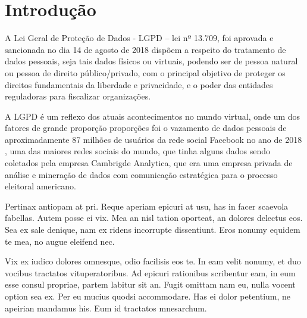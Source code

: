 \documentclass[
	12pt,				%
	openright,			%
	oneside,			%
	a4paper,			%
	english,			%
	french,				%
	spanish,			%
	brazil,				%
	]{abntex2}
\begin{document}

\tableofcontents*



\textual
\setcounter{page}{1}
\chapter*{Introdução}
\label{chapter:introducao}

A Lei Geral de Proteção de Dados - LGPD – lei nº 13.709, foi aprovada e sancionada no dia 14 de agosto de 2018 dispõem a respeito do tratamento de dados pessoais, seja tais dados físicos ou virtuais, podendo ser de pessoa natural ou pessoa de direito público/privado, com o principal objetivo de proteger os direitos fundamentais da liberdade e privacidade, e o poder das entidades reguladoras para fiscalizar organizações.

A LGPD é um reflexo dos atuais acontecimentos no mundo virtual, onde um dos fatores de grande proporção proporções foi o vazamento de dados pessoais de aproximadamente 87 milhões de usuários da rede social Facebook no ano de 2018 \cite{RevistaExame}, uma das maiores redes sociais do mundo, que tinha alguns dados sendo coletados pela empresa Cambrigde Analytica, que era uma empresa privada de análise e mineração de dados com comunicação estratégica para o processo eleitoral americano. 

Pertinax antiopam at pri. Reque aperiam epicuri at usu, has in facer scaevola fabellas. Autem posse ei vix. Mea an nisl tation oporteat, an dolores delectus eos. Sea ex sale denique, nam ex ridens incorrupte dissentiunt. Eros nonumy equidem te mea, no augue eleifend nec.

Vix ex iudico dolores omnesque, odio facilisis eos te. In eam velit nonumy, et duo vocibus tractatos vituperatoribus. Ad epicuri rationibus scribentur eam, in eum esse consul propriae, partem labitur sit an. Fugit omittam nam eu, nulla vocent option sea ex. Per eu mucius quodsi accommodare. Has ei dolor petentium, ne apeirian mandamus his. Eum id tractatos mnesarchum.
\end{document}
